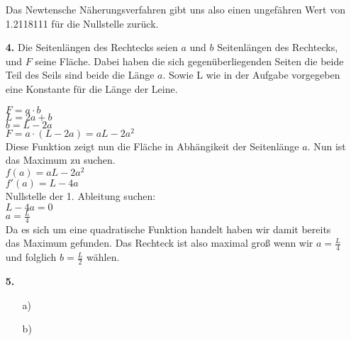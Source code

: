 \documentclass[a4paper,11pt]{scrartcl}
\begin{document}
\begin{enumerate}
        Das Newtensche Näherungsverfahren gibt uns also einen ungefähren Wert von 1.2118111 für die Nullstelle zurück.

    \newpage
    \item[\textbf{4.}]
        Die Seitenlängen des Rechtecks seien $a$ und $b$ Seitenlängen des Rechtecks, und $F$ seine Fläche.
        Dabei haben die sich gegenüberliegenden Seiten die beide Teil des Seils sind beide die Länge $a$.
        Sowie L wie in der Aufgabe vorgegeben eine Konstante für die Länge der Leine.

        \(F = a \cdot b\) \\
        \(L = 2a + b\) \\
        \(b = L - 2a\) \\
        \(F = a \cdot (L - 2a) = aL - 2a^2\) \\
        Diese Funktion zeigt nun die Fläche in Abhängikeit der Seitenlänge $a$. Nun ist das Maximum zu suchen. \\
        \(f(a) = aL - 2a^2\) \\
        \(f'(a) = L - 4a\) \\
        Nullstelle der 1. Ableitung suchen: \\
        \(L - 4a = 0\) \\
        \(a = \frac{L}{4}\) \\
        Da es sich um eine quadratische Funktion handelt haben wir damit bereits das Maximum gefunden.
        Das Rechteck ist also maximal groß wenn wir $a = \frac{L}{4}$ und folglich $b = \frac{L}{2}$ wählen.
    \item[\textbf{5.}]
        \begin{enumerate}
            \item[a)]
            \item[b)]
        \end{enumerate}
    \end{enumerate}
\end{document}
